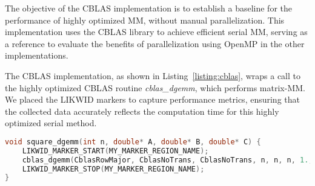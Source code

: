 The objective of the CBLAS implementation is to establish a baseline for the performance of highly optimized MM, without manual parallelization. This implementation uses the CBLAS library \cite{cblas} to achieve efficient serial MM, serving as a reference to evaluate the benefits of parallelization using OpenMP in the other implementations.

The CBLAS implementation, as shown in Listing~\ref{listing:cblas}, wraps a call to the highly optimized CBLAS routine \textit{cblas\_dgemm}, which performs matrix-MM. We placed the LIKWID markers to capture performance metrics, ensuring that the collected data accurately reflects the computation time for this highly optimized serial method.

\begin{lstlisting}[caption={\textbf{CBLAS implementation using the cblas\_dgemm routine for optimized serial MM.} LIKWID markers are used to measure performance data specific to the CBLAS execution.},label={listing:cblas},name=cblas,float=htbp,style=mystyle,language=C++]
void square_dgemm(int n, double* A, double* B, double* C) {
    LIKWID_MARKER_START(MY_MARKER_REGION_NAME);
    cblas_dgemm(CblasRowMajor, CblasNoTrans, CblasNoTrans, n, n, n, 1., A, n, B, n, 1., C, n);
    LIKWID_MARKER_STOP(MY_MARKER_REGION_NAME);
}
\end{lstlisting}